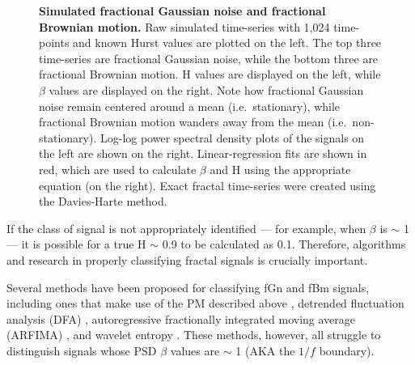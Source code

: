 \documentclass[
  sn-vancouver,
  Numbered,
  referee,
  lineno]{sn-jnl}
\begin{document}
\begin{figure}[H]


\caption{\label{fig-typicalsamplepaths}\textbf{Simulated fractional
Gaussian noise and fractional Brownian motion.} Raw simulated
time-series with 1,024 time-points and known Hurst values are plotted on
the left. The top three time-series are fractional Gaussian noise, while
the bottom three are fractional Brownian motion. H values are displayed
on the left, while \(\beta\) values are displayed on the right. Note how
fractional Gaussian noise remain centered around a mean
(i.e.~stationary), while fractional Brownian motion wanders away from
the mean (i.e.~non-stationary). Log-log power spectral density plots of
the signals on the left are shown on the right. Linear-regression fits
are shown in red, which are used to calculate \(\beta\) and H using the
appropriate equation (on the right). Exact fractal time-series were
created using the Davies-Harte method.}

\end{figure}%

If the class of signal is not appropriately identified --- for example,
when \(\beta\) is \(\sim\) 1 --- it is possible for a true H \(\sim\)
0.9 to be calculated as 0.1. Therefore, algorithms and research in
properly classifying fractal signals is crucially important.

Several methods have been proposed for classifying fGn and fBm signals,
including ones that make use of the PM described above
\citep{ekePhysiologicalTimeSeries2000, ekeFractalCharacterizationComplexity2002},
detrended fluctuation analysis (DFA)
\citep{pengLongrangeAnticorrelationsNonGaussian1993}, autoregressive
fractionally integrated moving average (ARFIMA)
\citep{grangerINTRODUCTIONLONGMEMORYTIME1980}, and wavelet entropy
\citep{ramirezpachecoDistinguishingStationaryNonstationary2012, ramirez-pachecoClassificationFractalSignals2017}.
These methods, however, all struggle to distinguish signals whose PSD
\(\beta\) values are \(\sim\) 1 \citep{ekePhysiologicalTimeSeries2000}
(AKA the \(1/f\) boundary).
\end{document}
